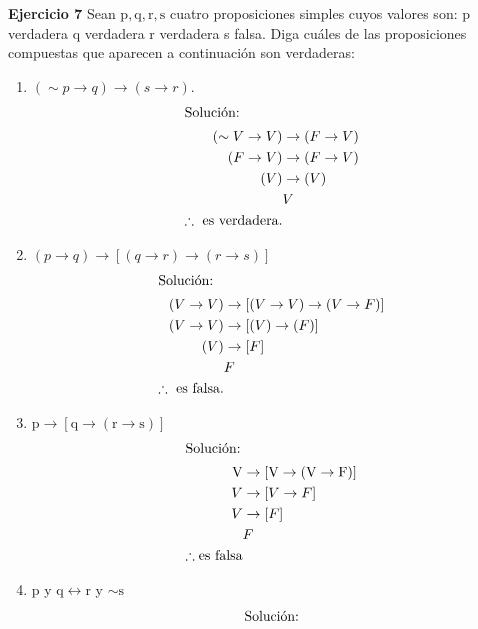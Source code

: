 \documentclass[a4paper,12pt]{article}
\begin{document}
\textbf{Ejercicio 7}
Sean $\mathrm{p}, \mathrm{q}, \mathrm{r}, \mathrm{s}$ cuatro proposiciones simples cuyos valores son:\newline\newline 
p verdadera\newline
q verdadera\newline
r verdadera\newline
s falsa.\newline
Diga cuáles de las proposiciones compuestas que aparecen a continuación son verdaderas:
\begin{enumerate}
    \item $(\sim p \rightarrow q) \rightarrow(s \rightarrow r)$.
    \begin{align}
    \intertext{Solución:}
    (\sim V\to V)&\to (F\to V)\\
    (F\to V)&\to (F\to V)\\
    (V)&\to (V)\\
    &V\\ \therefore \text{ es verdadera.}
    \end{align}
    \item $(p \rightarrow q) \rightarrow[(q \rightarrow r) \rightarrow(r \rightarrow s)]$
    \begin{align}
        \intertext{Solución:}
        (V \rightarrow V) &\rightarrow[(V \rightarrow V) \rightarrow(V \rightarrow F)]\\
        (V \rightarrow V) &\rightarrow[(V)\to(F)]\\
        (V)&\to [F]\\
        & F\\
        \therefore \text{ es falsa.}
    \end{align}
    \item $\mathrm{p} \rightarrow[\mathrm{q} \rightarrow(\mathrm{r} \rightarrow \mathrm{s})]$
    \begin{align}
        \intertext{Solución:}
        \mathrm{V} &\rightarrow[\mathrm{V} \rightarrow(\mathrm{V} \rightarrow \mathrm{F})]\\
        V &\to [V\to F]\\
        V&\to [F]\\
        & F\\
        \therefore \text{es falsa}
    \end{align}
    \item  $\mathrm{p}$ y $\mathrm{q} \leftrightarrow \mathrm{r}$ y $ \sim \mathrm{s}$
    \begin{align}
        \intertext{Solución:}

\end{align}
\end{enumerate}
\end{document}
